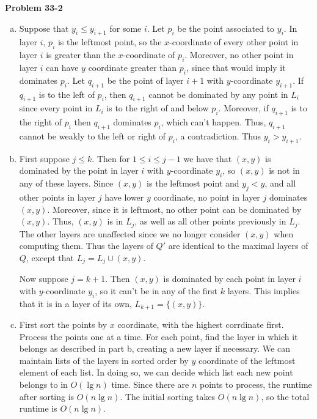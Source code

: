 \documentclass{article}
\begin{document}
\noindent\textbf{Problem 33-2}\\
\begin{enumerate}[a.]
\item Suppose that $y_i \leq y_{i+1}$ for some $i$.  Let $p_i$ be the point associated to $y_i$.  In layer $i$, $p_i$ is the leftmost point, so the $x$-coordinate of every other point in layer $i$ is greater than the $x$-coordinate of $p_i$.  Moreover, no other point in layer $i$ can have $y$ coordinate greater than $p_i$, since that would imply it dominates $p_i$.  Let $q_{i+1}$ be the point of layer $i+1$ with $y$-coordinate $y_{i+1}$.  If $q_{i+1}$ is to the left of $p_i$, then $q_{i+1}$ cannot be dominated by any point in $L_i$ since every point in $L_i$ is to the right of and below $p_i$.  Moreover, if $q_{i+1}$ is to the right of $p_i$ then $q_{i+1}$ dominates $p_i$, which can't happen. Thus, $q_{i+1}$ cannot be weakly to the left or right of $p_i$, a contradiction. Thus $y_i > y_{i+1}$. 

\item First suppose $j \leq k$.  Then for $1 \leq i \leq j-1$ we have that $(x,y)$ is dominated by the point in layer $i$ with $y$-coordinate $y_i$, so $(x,y)$ is not in any of these layers.  Since $(x,y)$ is the leftmost point and $y_j < y$, and all other points in layer $j$ have lower $y$ coordinate, no point in layer $j$ dominates $(x,y)$.  Moreover, since it is leftmost, no other point can be dominated by $(x,y)$. Thus, $(x,y)$ is in $L_j$, as well as all other points previously in $L_j$.  The other layers are unaffected since we no longer consider $(x,y)$ when computing them.  Thus the layers of $Q'$ are identical to the maximal layers of $Q$, except that $L_j = L_j \cup (x,y)$. 

Now suppose $j=k+1$.  Then $(x,y)$ is dominated by each point in layer $i$ with $y$-coordinate $y_i$, so it can't be in any of the first $k$ layers.  This implies that it is in a layer of its own, $L_{k+1}=\{(x,y)\}$. 

\item First sort the points by $x$ coordinate, with the highest corrdinate first.  Process the points one at a time.  For each point, find the layer in which it belongs as described in part b, creating a new layer if necessary.  We can maintain lists of the layers in sorted order by $y$ coordinate of the leftmost element of each list.  In doing so, we can decide which list each new point belongs to in $O(\lg n)$ time.  Since there are $n$ points to process, the runtime after sorting is $O(n\lg n)$.  The initial sorting takes $O(n \lg n)$, so the total runtime is $O(n \lg n)$. 


\end{enumerate}
\end{document}
